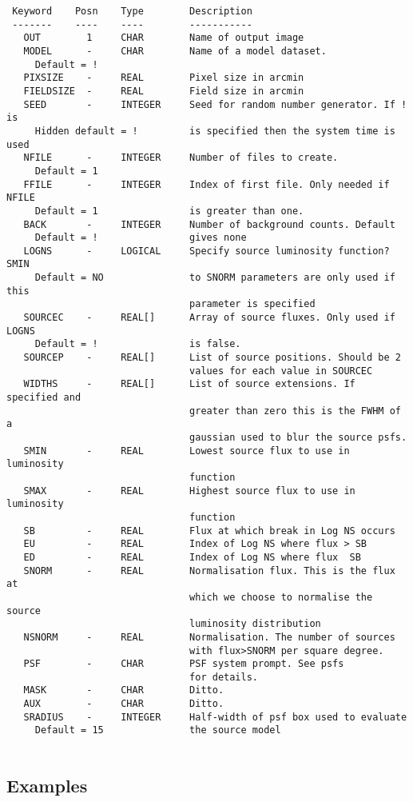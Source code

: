 \documentclass{book}
\renewcommand{\_}{{\tt\char'137}}     %
\begin{document}
\begin{verbatim}
 Keyword    Posn    Type        Description
 -------    ----    ----        -----------
   OUT        1     CHAR        Name of output image
   MODEL      -     CHAR        Name of a model dataset.
     Default = !
   PIXSIZE    -     REAL        Pixel size in arcmin
   FIELDSIZE  -     REAL        Field size in arcmin
   SEED       -     INTEGER     Seed for random number generator. If ! is
     Hidden default = !         is specified then the system time is used
   NFILE      -     INTEGER     Number of files to create.
     Default = 1
   FFILE      -     INTEGER     Index of first file. Only needed if NFILE
     Default = 1                is greater than one.
   BACK       -     INTEGER     Number of background counts. Default
     Default = !                gives none
   LOGNS      -     LOGICAL     Specify source luminosity function? SMIN
     Default = NO               to SNORM parameters are only used if this
                                parameter is specified
   SOURCEC    -     REAL[]      Array of source fluxes. Only used if LOGNS
     Default = !                is false.
   SOURCEP    -     REAL[]      List of source positions. Should be 2
                                values for each value in SOURCEC
   WIDTHS     -     REAL[]      List of source extensions. If specified and
                                greater than zero this is the FWHM of a
                                gaussian used to blur the source psfs.
   SMIN       -     REAL        Lowest source flux to use in luminosity
                                function
   SMAX       -     REAL        Highest source flux to use in luminosity
                                function
   SB         -     REAL        Flux at which break in Log NS occurs
   EU         -     REAL        Index of Log NS where flux > SB
   ED         -     REAL        Index of Log NS where flux  SB
   SNORM      -     REAL        Normalisation flux. This is the flux at
                                which we choose to normalise the source
                                luminosity distribution
   NSNORM     -     REAL        Normalisation. The number of sources
                                with flux>SNORM per square degree.
   PSF        -     CHAR        PSF system prompt. See psfs
                                for details.
   MASK       -     CHAR        Ditto.
   AUX        -     CHAR        Ditto.
   SRADIUS    -     INTEGER     Half-width of psf box used to evaluate
     Default = 15               the source model
 
\end{verbatim}\subsection{Examples}
\end{document}

